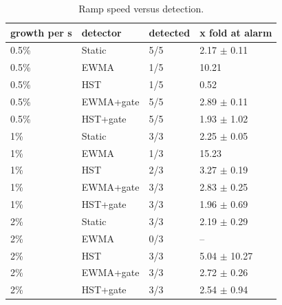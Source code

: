 \begin{table}[t]
\centering\small
\caption{Ramp speed versus detection.}\label{tab:growth}
\begin{tabular}{llll}
\toprule
growth per s & detector & detected & x fold at alarm \\
\midrule
0.5\% & Static & 5/5 & 2.17 $\pm$ 0.11 \\
0.5\% & EWMA & 1/5 & 10.21 \\
0.5\% & HST & 1/5 & 0.52 \\
0.5\% & EWMA+gate & 5/5 & 2.89 $\pm$ 0.11 \\
0.5\% & HST+gate & 5/5 & 1.93 $\pm$ 1.02 \\
1\% & Static & 3/3 & 2.25 $\pm$ 0.05 \\
1\% & EWMA & 1/3 & 15.23 \\
1\% & HST & 2/3 & 3.27 $\pm$ 0.19 \\
1\% & EWMA+gate & 3/3 & 2.83 $\pm$ 0.25 \\
1\% & HST+gate & 3/3 & 1.96 $\pm$ 0.69 \\
2\% & Static & 3/3 & 2.19 $\pm$ 0.29 \\
2\% & EWMA & 0/3 & -- \\
2\% & HST & 3/3 & 5.04 $\pm$ 10.27 \\
2\% & EWMA+gate & 3/3 & 2.72 $\pm$ 0.26 \\
2\% & HST+gate & 3/3 & 2.54 $\pm$ 0.94 \\
\bottomrule
\end{tabular}
\end{table}
